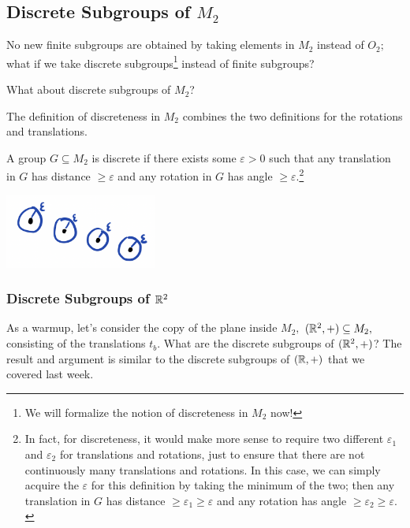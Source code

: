 \subsection{Discrete Subgroups of \texorpdfstring{$M_2$}{M2}}

No new finite subgroups are obtained by taking elements in $M_2$ instead of $O_2;$ what if we take discrete subgroups\footnote{We will formalize the notion of discreteness in $M_2$ now!} instead of finite subgroups? 

\begin{qq}
What about discrete subgroups of $M_2$? 
\end{qq}

The definition of discreteness in $M_2$ combines the two definitions for the rotations and translations.
\begin{definition}
A group $G \subseteq M_2$ is discrete if there exists some $\varepsilon > 0$ such that any translation in $G$ has distance $\geq \varepsilon$ and any rotation in $G$ has angle $\geq \varepsilon.$\footnote{In fact, for discreteness, it would make more sense to require two different $\varepsilon_1$ and $\varepsilon_2$ for translations and rotations, just to ensure that there are not continuously many translations and rotations. In this case, we can simply acquire the $\varepsilon$ for this definition by taking the minimum of the two; then any translation in $G$ has distance $\geq \varepsilon_1 \geq \varepsilon$ and any rotation has angle $\geq \varepsilon_2 \geq \varepsilon.$}

\begin{center}
    \includegraphics[width=5cm]{Lecture Files and Images/lec15-balls.png}
\end{center}
\end{definition}


\subsubsection{Discrete Subgroups of \texorpdfstring{$\mathbb R^2$}{R2}}

As a warmup, let's consider the copy of the plane inside $M_2,$ $(\mathbb R^2, +) \subseteq M_2,$ consisting of the translations $t_b.$ What are the discrete subgroups of $(\mathbb R^2, +)$? The result and argument is similar to the discrete subgroups of $(\mathbb R, +)$ that we covered last week. 

